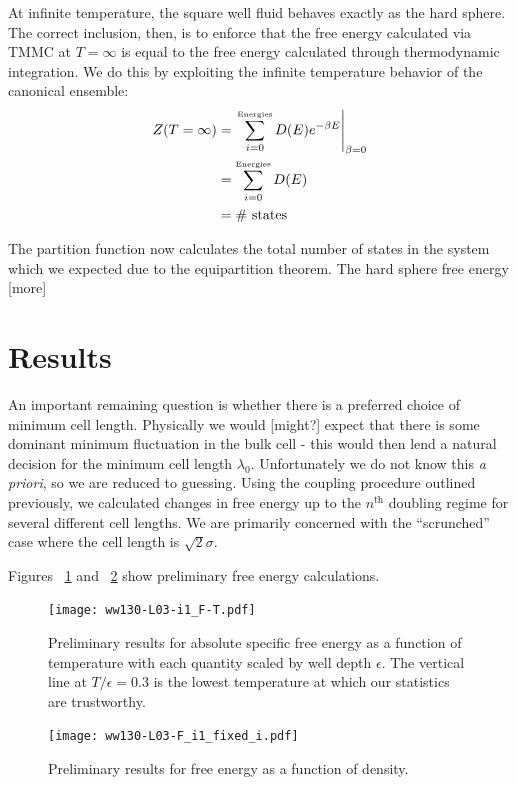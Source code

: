 \documentclass[12pt]{article}
\newcommand{\ignore}[1]{}
\begin{document}
At infinite temperature, the square well fluid behaves exactly as the hard sphere. The correct inclusion, then, is to enforce that the free energy calculated via TMMC at $T=\infty$ is equal to the free energy calculated through thermodynamic integration. We do this by exploiting the infinite temperature behavior of the canonical ensemble:
\begin{align}
    Z(T=\infty) &= \left.\sum_{i=0}^{\text{\tiny Energies}} D(E) e^{-\beta E}\right|_{\beta = 0}\\
    &= \sum_{i=0}^{\text{\tiny Energies}} D(E)\\
    &= \#\text{~states}
\end{align}

\ignore{NB: cough cough the HS energy probs wrong}
The partition function now calculates the total number of states in the system which we expected due to the equipartition theorem. The hard sphere free energy [more] 




\section{Results}
An important remaining question is whether there is a preferred choice of minimum cell length. Physically we would [might?] expect that there is some dominant minimum fluctuation in the bulk cell - this would then lend a natural decision for the minimum cell length $\lambda_0$. Unfortunately we do not know this {\it a priori}, so we are reduced to guessing. Using the coupling procedure outlined previously, we calculated changes in free energy up to the $n^{\text{th}}$ doubling regime for several different cell lengths. We are primarily concerned with the ``scrunched'' case where the cell length is $\sqrt2\sigma$.

Figures ~\ref{F-T} and ~\ref{F-eta} show preliminary free energy calculations.
\begin{figure}[H]
\centering
    \texttt{[image: ww130-L03-i1\_F-T.pdf]}
    \caption{Preliminary results for absolute specific free energy as a function of temperature with each quantity scaled by well depth $\epsilon$. The vertical line at $T/\epsilon = 0.3$ is the lowest temperature at which our statistics are trustworthy.}
    \label{F-T}
\end{figure}
\begin{figure}
\centering
    \texttt{[image: ww130-L03-F\_i1\_fixed\_i.pdf]}
    \caption{Preliminary results for free energy as a function of density.}
    \label{F-eta}
\end{figure}
\end{document}
